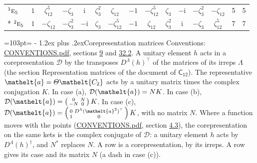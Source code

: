 \documentclass[10pt,a4paper]{article}
\makeatletter
\renewcommand\section{\@startsection{section}{1}{\z@}{-3ex plus -1ex minus -.2ex}%
  {1.2ex plus .2ex}{\normalfont\large\sffamily\bfseries\color{parttitle}}}
\newcommand{\needspace}[1]{\par\penalty-100\begingroup\dimen0=#1\relax\dimen2=\pagegoal
  \advance\dimen2-\pagetotal\ifdim\dimen0>\dimen2\relax\ifdim\dimen2>0pt\vfil\break\fi\fi
  \endgroup}
\numberwithin{equation}{section}
\newcommand{\eltfont}[1]{{\let\sigma\eltsigma\mathelt{#1}}}
\newcommand{\grp}[1]{\mathsf{#1}}
\newcommand{\irr}[1]{\text{\normalfont\scshape #1}}
\newcommand{\conjpair}[1]{{}^{#1}}
\newcommand{\elt}[1]{\eltfont{#1}}
\newcommand{\iunit}{\mathrm{i}}
\newcommand{\rootunity}[1]{\zeta_{#1}}
\makeatother
\begin{document}
{\begin{longtable}{@{}lccccccccccccll@{}}
$\conjpair{1}\irr{e}_{5}$ & $1$ & $\rootunity{12}^{5}$ & $-\rootunity{3}$ & $\iunit{}$ & $\rootunity{3}^{2}$ & $\rootunity{12}$ & $-1$ & $-\rootunity{12}^{5}$ & $\rootunity{3}$ & $-\iunit{}$ & $-\rootunity{3}^{2}$ & $-\rootunity{12}$ & 5 & 5\\*
$\conjpair{2}\irr{e}_{5}$ & $1$ & $-\rootunity{12}$ & $-\rootunity{3}^{2}$ & $-\iunit{}$ & $\rootunity{3}$ & $-\rootunity{12}^{5}$ & $-1$ & $\rootunity{12}$ & $\rootunity{3}^{2}$ & $\iunit{}$ & $-\rootunity{3}$ & $\rootunity{12}^{5}$ & 7 & 7\\
\bottomrule\end{longtable}}
\needspace{103pt}
\section{Corepresentation matrices}\label{s:corep_matrices}
Conventions: \href{../../CONVENTIONS.pdf}{CONVENTIONS.pdf}, sections \href{../../../rotation/CONVENTIONS.pdf\#conv.9}{9} and \href{../../CONVENTIONS.pdf\#conv.32.2}{32.2}.
A unitary element $h$ acts in a corepresentation $\mathcal{D}$ by the transposes $D^{\Lambda}(h)^{\top}$ of the matrices of its irreps $\Lambda$ (the section Representation matrices of the document of \href{../../../rotation/data/pdf/C12.pdf}{$\grp{C_{12}}$}). The representative $\elt{a} = \varTheta\elt{C_{2}}$ acts by a unitary matrix times the complex conjugation $K$.
In case (a), $\mathcal{D}(\elt{a}) = NK$. In case (b), $\mathcal{D}(\elt{a}) = \left(\begin{smallmatrix} 0 & N \\ -N & 0 \end{smallmatrix}\right) K$. In case (c), $\mathcal{D}(\elt{a}) = \left(\begin{smallmatrix} 0 & D^{\Lambda}(\elt{a}^2)^{\top} \\ 1 & 0 \end{smallmatrix}\right) K$, with no matrix $N$.
Where a function moves with the points (\href{../../CONVENTIONS.pdf}{CONVENTIONS.pdf}, section \href{../../../rotation/CONVENTIONS.pdf\#conv.4.3}{4.3}), the corepresentation on the same kets is the complex conjugate of $\mathcal{D}$: a unitary element $h$ acts by $D^{\Lambda}(h)^{\dagger}$, and $N^{*}$ replaces $N$.
A row is a corepresentation, by its irreps. A row gives its case and its matrix $N$ (a dash in case (c)).
\end{document}
